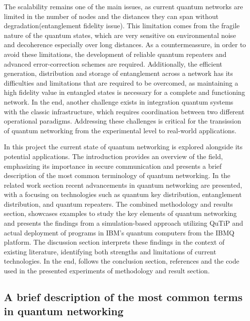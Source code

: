 \documentclass[12pt]{ieeetj}
\begin{document}
		The scalability remains one of the main issues,
		as current quantum networks are limited in the number of nodes and the
		distances they can span without degradation(entanglement fidelity issue).
		This limitation comes from the fragile nature of the quantum states,
		which are very sensitive on environmental noise and decoherence especially over long distances.
		As a countermeassure, in order to avoid these limitations, the development of reliable quantum repeaters
		and advanced error-correction schemes are required.	
		Additionally, the efficient generation, distribution and storage of entanglement 
		across a network has its difficulties and limitations that are required to be overcomed, 
		as maintaining a high fidelity value in entangled
		states is necessary for a complete and functioning network.
		In the end, another challenge exists in integration
	        quantum systems with the classic infrastructure,
	        which requires coordination between
	        two different operational paradigms.
	        Addressing these challenges is critical for the transission of 
		quantum networking from the experimental level to real-world applications.

		In this project the current state of quantum networking is explored alongside its potential applications. 
		The introduction provides an overview of the field, emphasizing its importance in secure communication and presents a brief
		description of the most common terminology of quantum networking.	
		In the related work section recent advancements in quantum networking are presented, with a focusing on technologies such as 
		quantum key distribution, entanglement distribution, and quantum repeaters. 
		The combined methodology and results section, showcases examples to study the key elements of quantum networking and presents the findings
		from a simulation-based approach utilizing QuTiP and actual deployment of programs in IBM's quantum computers from the IBMQ platform.
		The discussion section interprets these findings in the context of existing literature, 
		identifying both strengths and limitations of current technologies. 
		In the end, follows the conclusion section, references and the code used in the presented experiments of 
		methodology and result section.


		\subsection{A brief description of the most common terms in quantum networking}
\end{document}
